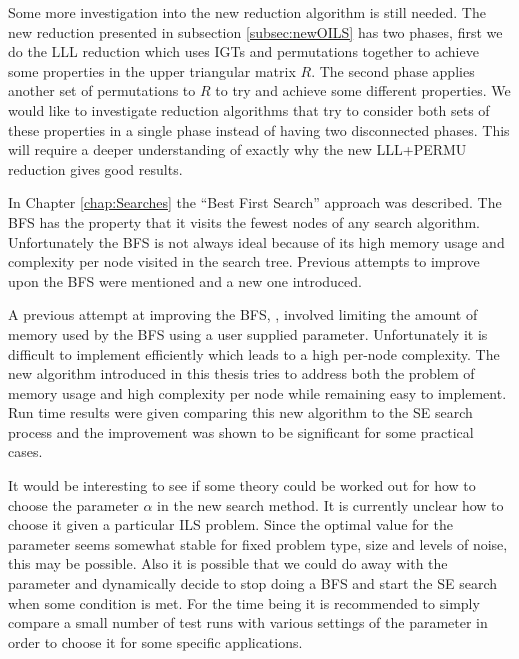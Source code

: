 \documentclass[12pt,Bold,letterpaper]{mcgilletdclass}
\begin{document}
Some more investigation into the new reduction algorithm is still needed. The new reduction presented in subsection \ref{subsec:newOILS} has two phases, first we do the LLL reduction which uses IGTs and permutations together to achieve some properties in the upper triangular matrix $R$. The second phase applies another set of permutations to $R$ to try and achieve some different properties. We would like to investigate reduction algorithms that try to consider both sets of these properties in a single phase instead of having two disconnected phases. This will require a deeper understanding of exactly why the new LLL+PERMU reduction gives good results.

In Chapter \ref{chap:Searches} the ``Best First Search'' approach was described. The BFS has the property that it visits the fewest nodes of any search algorithm. Unfortunately the BFS is not always ideal because of its high memory usage and complexity per node visited in the search tree. Previous attempts to improve upon the BFS were mentioned and a new one introduced. 

A previous attempt at improving the BFS, \cite{StuBF07}, involved limiting the amount of memory used by the BFS using a user supplied parameter. Unfortunately it is difficult to implement efficiently which leads to a high per-node complexity. The new algorithm introduced in this thesis tries to address both the problem of memory usage and high complexity per node while remaining easy to implement. Run time results were given comparing this new algorithm to the SE search process and the improvement was shown to be significant for some practical cases. 

It would be interesting to see if some theory could be worked out for how to choose the parameter $\alpha$ in the new search method. It is currently unclear how to choose it given a particular ILS problem. Since the optimal value for the parameter seems somewhat stable for fixed problem type, size and levels of noise, this may be possible. Also it is possible that we could do away with the parameter and dynamically decide to stop doing a BFS and start the SE search when some condition is met. For the time being it is recommended to simply compare a small number of test runs with various settings of the parameter in order to choose it for some specific applications.








\end{document}
